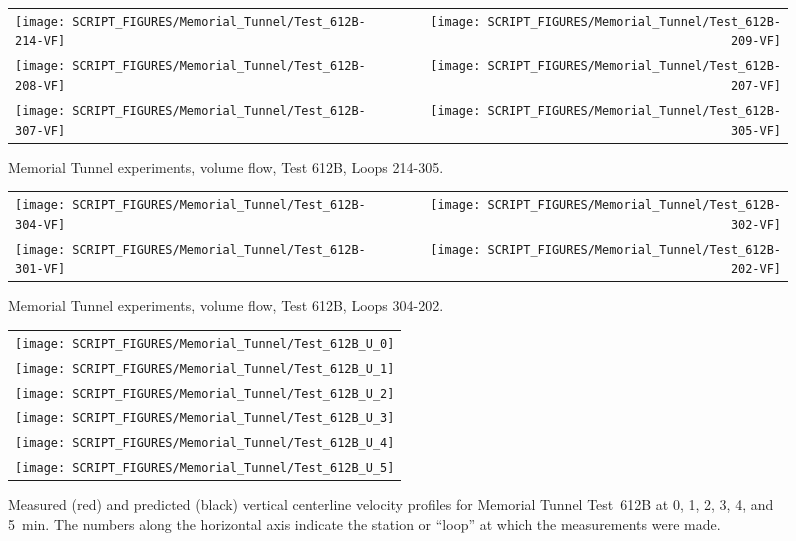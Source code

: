 \begin{figure}[p]
\begin{tabular*}{\textwidth}{l@{\extracolsep{\fill}}r}
\texttt{[image: SCRIPT\_FIGURES/Memorial\_Tunnel/Test\_612B-214-VF]} &
\texttt{[image: SCRIPT\_FIGURES/Memorial\_Tunnel/Test\_612B-209-VF]} \\
\texttt{[image: SCRIPT\_FIGURES/Memorial\_Tunnel/Test\_612B-208-VF]} &
\texttt{[image: SCRIPT\_FIGURES/Memorial\_Tunnel/Test\_612B-207-VF]} \\
\texttt{[image: SCRIPT\_FIGURES/Memorial\_Tunnel/Test\_612B-307-VF]} &
\texttt{[image: SCRIPT\_FIGURES/Memorial\_Tunnel/Test\_612B-305-VF]}
\end{tabular*}
\caption[Memorial Tunnel experiments, volume flow, Test 612B, Loops 214-305]{Memorial Tunnel experiments, volume flow, Test 612B, Loops 214-305.}
\label{Memorial_Tunnel_612B_214-305}
\end{figure}

\begin{figure}[p]
\begin{tabular*}{\textwidth}{l@{\extracolsep{\fill}}r}
\texttt{[image: SCRIPT\_FIGURES/Memorial\_Tunnel/Test\_612B-304-VF]} &
\texttt{[image: SCRIPT\_FIGURES/Memorial\_Tunnel/Test\_612B-302-VF]} \\
\texttt{[image: SCRIPT\_FIGURES/Memorial\_Tunnel/Test\_612B-301-VF]} &
\texttt{[image: SCRIPT\_FIGURES/Memorial\_Tunnel/Test\_612B-202-VF]}
\end{tabular*}
\caption[Memorial Tunnel experiments, volume flow, Test 612B, Loops 304-202]{Memorial Tunnel experiments, volume flow, Test 612B, Loops 304-202.}
\label{Memorial_Tunnel_612B_304-202}
\end{figure}

\begin{figure}[p]
\begin{tabular*}{\textwidth}{c}
\texttt{[image: SCRIPT\_FIGURES/Memorial\_Tunnel/Test\_612B\_U\_0]} \\
\texttt{[image: SCRIPT\_FIGURES/Memorial\_Tunnel/Test\_612B\_U\_1]} \\
\texttt{[image: SCRIPT\_FIGURES/Memorial\_Tunnel/Test\_612B\_U\_2]} \\
\texttt{[image: SCRIPT\_FIGURES/Memorial\_Tunnel/Test\_612B\_U\_3]} \\
\texttt{[image: SCRIPT\_FIGURES/Memorial\_Tunnel/Test\_612B\_U\_4]} \\
\texttt{[image: SCRIPT\_FIGURES/Memorial\_Tunnel/Test\_612B\_U\_5]}
\end{tabular*}
\caption[Memorial Tunnel experiments, velocity profiles, Test 612B, 0-5 min]{Measured (red) and predicted (black) vertical centerline velocity profiles for Memorial Tunnel Test~612B at 0, 1, 2, 3, 4, and 5~min. The numbers along the horizontal axis indicate the station or ``loop'' at which the measurements were made.}
\label{Memorial_612B_U_0-5}
\end{figure}

